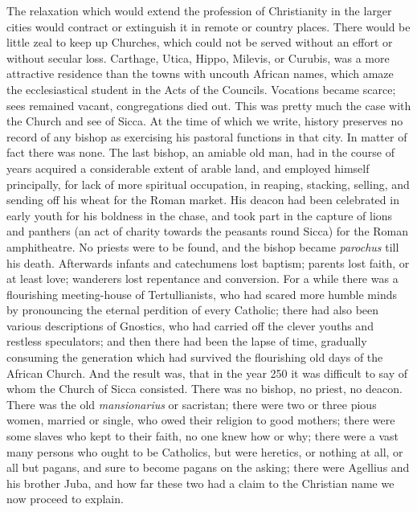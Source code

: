The relaxation which would extend the profession of Christianity in
the larger cities would contract or extinguish it in remote or country
places. There would be little zeal to keep up Churches, which could
not be served without an effort or without secular loss. Carthage,
Utica, Hippo, Milevis, or Curubis, was a more attractive residence
than the towns with uncouth African names, which amaze the
ecclesiastical student in the Acts of the Councils. Vocations became
scarce; sees remained vacant, congregations died out. This was pretty
much the case with the Church and see of Sicca. At the time of which
we write, history preserves no record of any bishop as exercising his
pastoral functions in that city. In matter of fact there was none. The
last bishop, an amiable old man, had in the course of years acquired a
considerable extent of arable land, and employed himself principally,
for lack of more spiritual occupation, in reaping, stacking, selling,
and sending off his wheat for the Roman market. His deacon had been
celebrated in early youth for his boldness in the chase, and took part
in the capture of lions and panthers (an act of charity towards
the peasants round Sicca) for the Roman amphitheatre. No priests were
to be found, and the bishop became \emph{parochus} till his death.
Afterwards infants and catechumens lost baptism; parents lost faith,
or at least love; wanderers lost repentance and conversion. For a
while there was a flourishing meeting-house of Tertullianists, who had
scared more humble minds by pronouncing the eternal perdition of every
Catholic; there had also been various descriptions of Gnostics, who
had carried off the clever youths and restless speculators; and then
there had been the lapse of time, gradually consuming the generation
which had survived the flourishing old days of the African Church. And
the result was, that in the year 250 it was difficult to say of whom
the Church of Sicca consisted. There was no bishop, no priest, no
deacon. There was the old \emph{mansionarius} or sacristan; there were
two or three pious women, married or single, who owed their religion
to good mothers; there were some slaves who kept to their faith, no
one knew how or why; there were a vast many persons who ought to be
Catholics, but were heretics, or nothing at all, or all but pagans,
and sure to become pagans on the asking; there were Agellius and his
brother Juba, and how far these two had a claim to the Christian name
we now proceed to explain.

